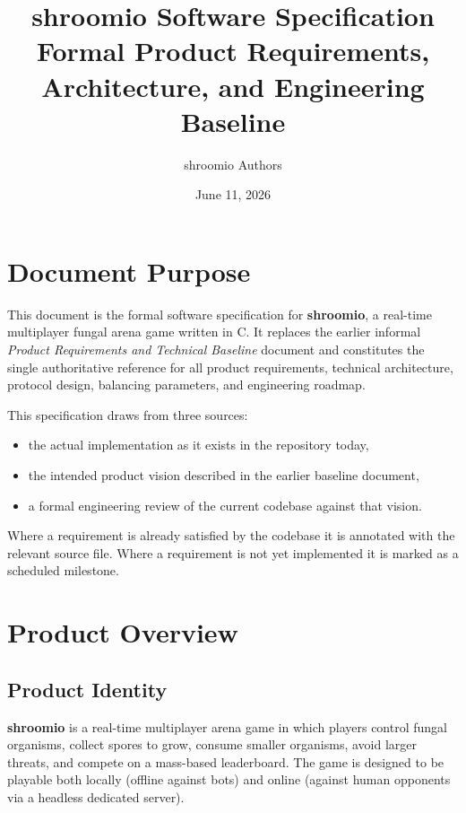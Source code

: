 \documentclass[11pt]{article}
\title{shroomio Software Specification\\\large Formal Product Requirements, Architecture, and Engineering Baseline}
\author{shroomio Authors}
\date{June 11, 2026}
\begin{document}
\maketitle

\tableofcontents

\section{Document Purpose}

This document is the formal software specification for \textbf{shroomio}, a real-time multiplayer fungal arena game written in C. It replaces the earlier informal \emph{Product Requirements and Technical Baseline} document and constitutes the single authoritative reference for all product requirements, technical architecture, protocol design, balancing parameters, and engineering roadmap.

This specification draws from three sources:
\begin{itemize}
  \item the actual implementation as it exists in the repository today,
  \item the intended product vision described in the earlier baseline document,
  \item a formal engineering review of the current codebase against that vision.
\end{itemize}

Where a requirement is already satisfied by the codebase it is annotated with the relevant source file. Where a requirement is not yet implemented it is marked as a scheduled milestone.

\section{Product Overview}

\subsection{Product Identity}

\textbf{shroomio} is a real-time multiplayer arena game in which players control fungal organisms, collect spores to grow, consume smaller organisms, avoid larger threats, and compete on a mass-based leaderboard. The game is designed to be playable both locally (offline against bots) and online (against human opponents via a headless dedicated server).
\end{document}
